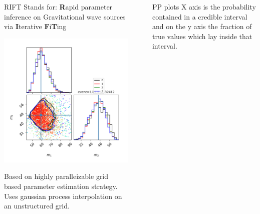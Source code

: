 \documentclass[serif]{beamer}
\begin{document}
\begin{frame}{}
\begin{columns}
\begin{column}[T]{.3\textwidth}
\begin{block}{RIFT}
Stands for:
\textbf{R}apid parameter inference on Gravitational wave sources via \textbf{I}terative \textbf{F}i\textbf{T}ing
\begin{center}
\includegraphics[scale=1.75]{Images/corner_m1_m2}
\end{center}

Based on highly paralleizable grid based parameter estimation strategy. Uses gaussian process interpolation on an unstructured grid.



\end{block}



\end{column}
~
\begin{column}[T]{0.35\textwidth}

\begin{block}{PP plots}
X axis is the probability contained in a credible interval and on the y axis the fraction of true values which lay inside that interval.



\end{block}
\end{column}
\end{columns}
\end{frame}
\end{document}

